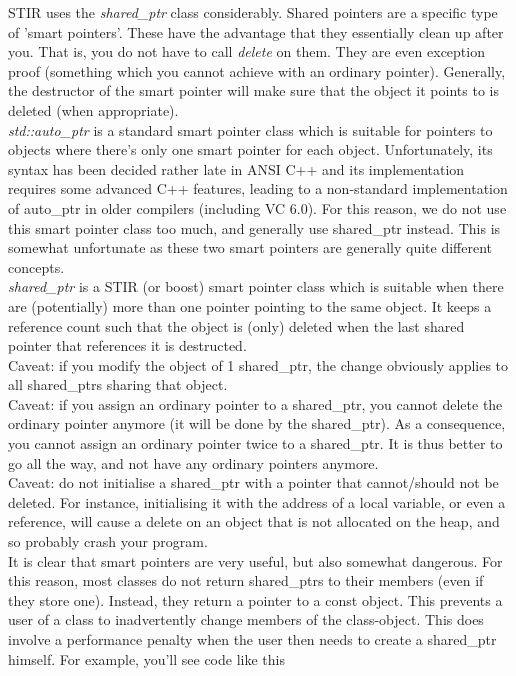 \documentclass{article}
\begin{document}
STIR uses the \textit{shared\_ptr} class considerably. Shared pointers 
are a specific type of 'smart pointers'. These have the advantage 
that they essentially clean up after you. That is, you do not 
have to call \textit{delete} on them. They are even exception proof 
(something which you cannot achieve with an ordinary pointer). 
Generally, the destructor of the smart pointer will make sure 
that the object it points to is deleted (when appropriate).\\
\textit{std::auto\_ptr} is a standard smart pointer class which is 
suitable for pointers to objects where there's only one smart 
pointer for each object. Unfortunately, its syntax has been decided 
rather late in ANSI C++ and its implementation requires some 
advanced C++ features, leading to a non-standard implementation 
of auto\_ptr in older compilers (including VC 6.0). For this 
reason, we do not use this smart pointer class too much, and 
generally use shared\_ptr instead. This is somewhat unfortunate 
as these two smart pointers are generally quite different concepts. 
\\
\textit{shared\_ptr} is a STIR (or boost) smart pointer class which 
is suitable when there are (potentially) more than one pointer 
pointing to the same object. It keeps a reference count such 
that the object is (only) deleted when the last shared pointer 
that references it is destructed. \\
Caveat: if you modify the object of 1 shared\_ptr, the change 
obviously applies to all shared\_ptrs sharing that object.\\
Caveat: if you assign an ordinary pointer to a shared\_ptr, you 
cannot delete the ordinary pointer anymore (it will be done by 
the shared\_ptr). As a consequence, you cannot assign an ordinary 
pointer twice to a shared\_ptr. It is thus better to go all the 
way, and not have any ordinary pointers anymore.\\
Caveat: do not initialise a shared\_ptr with a pointer that cannot/should 
not be deleted. For instance, initialising it with the address 
of a local variable, or even a reference, will cause a delete 
on an object that is not allocated on the heap, and so probably 
crash your program.\\
It is clear that smart pointers are very useful, but also somewhat 
dangerous. For this reason, most classes do not return shared\_ptrs 
to their members (even if they store one). Instead, they return 
a pointer to a const object. This prevents a user of a class 
to inadvertently change members of the class-object. This does 
involve a performance penalty when the user then needs to create 
a shared\_ptr himself. For example, you'll see code like this
\end{document}
